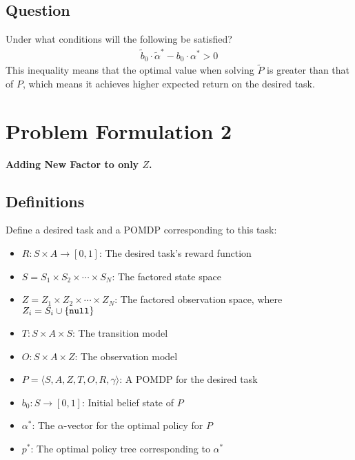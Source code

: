 \documentclass{article}
\newcommand{\td}[1]{\tilde{#1}}
\begin{document}
\subsection{Question}
Under what conditions will the following be satisfied?
\begin{align}
\td{b}_0\cdot \td{\alpha}^* - b_0\cdot \alpha^* > 0
\end{align}
This inequality means that the optimal value when solving $\td{P}$ is greater than that of $P$, which means it achieves higher expected return on the desired task.




\section{Problem Formulation 2}

\textbf{Adding New Factor to only $Z$.}

\subsection{Definitions}
Define a desired task and a POMDP corresponding to this task:
\begin{itemize}
\item $R:S\times A\rightarrow[0,1]$: The desired task's reward function
\item $S=S_1\times S_2\times\cdots\times S_N$: The factored state space
\item $Z=Z_1\times Z_2\times\cdots\times Z_N$: The factored observation space, where $Z_i=S_i\cup\{\texttt{null}\}$
\item $T:S\times A\times S$: The transition model
\item $O:S\times A\times Z$: The observation model
\item $P=\langle S,A,Z,T,O,R,\gamma  \rangle$: A POMDP for the desired task
\item $b_0: S\rightarrow [0,1]$: Initial belief state of $P$
\item $\alpha^*$: The $\alpha$-vector for the optimal policy for $P$
\item $p^*$: The optimal policy tree corresponding to $\alpha^*$
\end{itemize}
\end{document}
